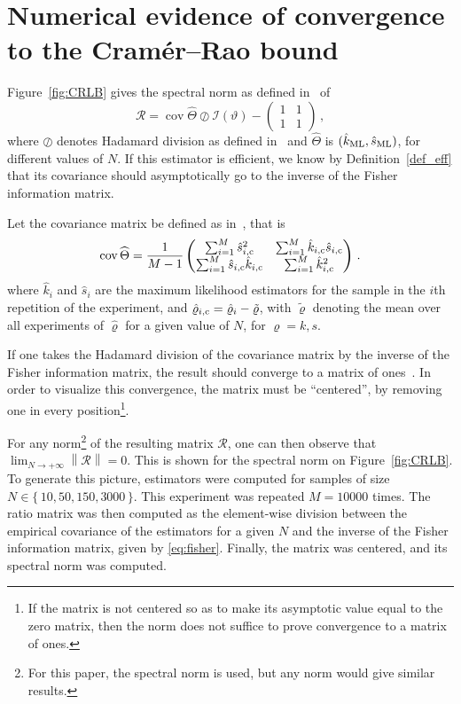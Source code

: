 \documentclass[final]{aomart}
\newtheorem[{}\it]{thm}{Theorem}[section]
\theoremstyle{definition}
\newtheorem*[{}\it]{notation}{Notation}
\numberwithin{equation}{section}
\newcommand{\wh}{\widehat}
\renewcommand{\theta}{\vartheta}
\renewcommand{\rho}{\varrho}
\newcommand{\hTheta}{\wh{\Theta}} %
\newcommand{\fisher}{\mathcal{I}} %
\DeclareMathOperator{\cov}{cov}
\newcommand{\enVert}[1]{\left\lVert#1\right\rVert}
\let\norm=\enVert
\begin{document}
\section{Numerical evidence of convergence to the Cramér--Rao bound}
\label{sec:ratio}
Figure~\ref{fig:CRLB} gives the spectral norm as defined in~\cite{wiki:spectral} of
\begin{equation}
\mathscr{R} = \cov \hTheta \oslash \fisher(\theta) - \begin{pmatrix} 1&1\\1&1 \end{pmatrix}\,,
\end{equation}
where \(\oslash\) denotes Hadamard division as defined in~\cite{wiki:hadamard} and \(\hTheta\) is \((\hat{k}_{\textnormal{ML}}, \hat{s}_{\textnormal{ML}})\), for different values of \(N\).
If this estimator is efficient, we know by Definition~\ref{def_eff} that its covariance should asymptotically go to the inverse of the Fisher information matrix.

Let the covariance matrix be defined as in~\cite{wiki:scm}, that is
\begin{equation}
\cov \hTheta = \frac{1}{M-1} \begin{pmatrix} \sum_{i=1}^M \hat{s}_{i, \textnormal{c}}^2 & \sum_{i=1}^M \hat{k}_{i, \textnormal{c}} \hat{s}_{i, \textnormal{c}} \\ \sum_{i=1}^M \hat{s}_{i, \textnormal{c}} \hat{k}_{i, \textnormal{c}} & \sum_{i=1}^M \hat{k}_{i, \textnormal{c}}^2 \end{pmatrix}\,.
\end{equation}
where \(\hat{k}_i\) and \(\hat{s}_i\) are the maximum likelihood estimators for the sample in the \(i\)th repetition of the experiment, and \(\hat{\rho}_{i, \textnormal{c}} = \hat{\rho}_i - \tilde{\rho}\), with \(\tilde{\rho}\) denoting the mean over all experiments of \(\hat{\rho}\) for a given value of \(N\), for \(\rho = k, s\).

If one takes the Hadamard division of the covariance matrix by the inverse of the Fisher information matrix, the result should converge to a matrix of ones~\cite{wiki:hadamard}.
In order to visualize this convergence, the matrix must be ``centered'', by removing one in every position\footnote{If the matrix is not centered so as to make its asymptotic value equal to the zero matrix, then the norm does not suffice to prove convergence to a matrix of ones.}.

For any norm\footnote{For this paper, the spectral norm is used, but any norm would give similar results.} of the resulting matrix \(\mathscr{R}\), one can then observe that \(\lim_{N \to +\infty} \norm{\mathscr{R}} = 0\).
This is shown for the spectral norm on Figure~\ref{fig:CRLB}.
To generate this picture, estimators were computed for samples of size \(N \in \{\,10, 50, 150, 3000\,\}\).
This experiment was repeated \(M = 10000\) times.
The ratio matrix was then computed as the element-wise division between the empirical covariance of the estimators for a given \(N\) and the inverse of the Fisher information matrix, given by \eqref{eq:fisher}.
Finally, the matrix was centered, and its spectral norm was computed.
\end{document}
